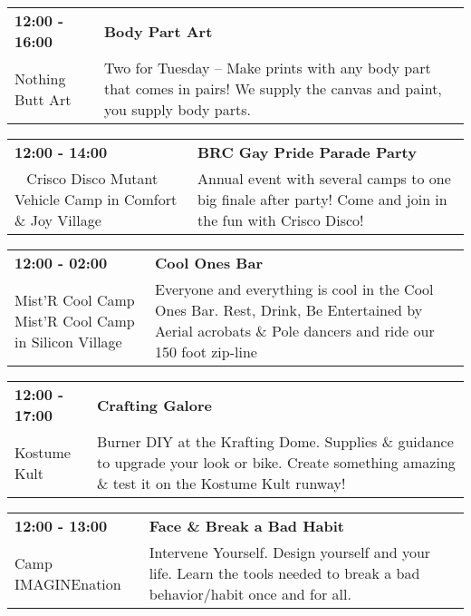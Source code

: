 \begin{tabular}{ p{1in} p{2.2in} }
    \textbf{12:00 - 16:00} & \textbf{Body Part Art} \\
    Nothing Butt Art \newline  & Two for Tuesday -- Make prints with any body part that comes in pairs! We supply the canvas and paint, you supply body parts. \\
    \hline 
\end{tabular}
    
\begin{tabular}{ p{1in} p{2.2in} }
    \textbf{12:00 - 14:00} & \textbf{BRC Gay Pride Parade Party} \\
    ~ \newline Crisco Disco Mutant Vehicle Camp in Comfort \& Joy Village & Annual event with several camps to one big finale after party! Come and join in the fun with Crisco Disco! \\
    \hline 
\end{tabular}
    
\begin{tabular}{ p{1in} p{2.2in} }
    \textbf{12:00 - 02:00} & \textbf{Cool Ones Bar } \\
    Mist'R Cool Camp \newline Mist'R Cool Camp in Silicon Village & Everyone and everything is cool in the Cool Ones Bar. Rest, Drink, Be Entertained by Aerial acrobats \& Pole dancers and ride our 150 foot zip-line \\
    \hline 
\end{tabular}
    
\begin{tabular}{ p{1in} p{2.2in} }
    \textbf{12:00 - 17:00} & \textbf{Crafting Galore} \\
    Kostume Kult \newline  & Burner DIY at the Krafting Dome. Supplies \& guidance to upgrade your look or bike. Create something amazing \& test it on the Kostume Kult runway! \\
    \hline 
\end{tabular}
    
\begin{tabular}{ p{1in} p{2.2in} }
    \textbf{12:00 - 13:00} & \textbf{Face \& Break a Bad Habit} \\
    Camp IMAGINEnation \newline  & Intervene Yourself. Design yourself and your life.  Learn the tools needed to break a bad behavior/habit once and for all. \\
    \hline 
\end{tabular}
    
